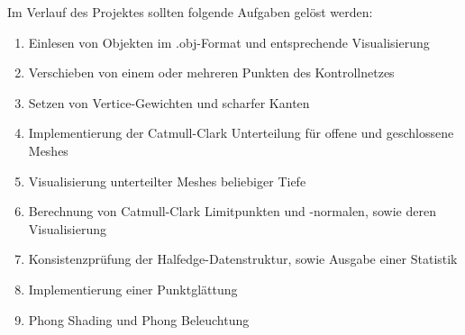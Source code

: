 Im Verlauf des Projektes sollten folgende Aufgaben gelöst werden:
\begin{enumerate}
\item Einlesen von Objekten im .obj-Format und entsprechende Visualisierung
\item Verschieben von einem oder mehreren Punkten des Kontrollnetzes
\item Setzen von Vertice-Gewichten und scharfer Kanten
\item Implementierung der Catmull-Clark Unterteilung für offene und geschlossene Meshes
\item Visualisierung unterteilter Meshes beliebiger Tiefe
\item Berechnung von Catmull-Clark Limitpunkten und -normalen, sowie deren Visualisierung
\item Konsistenzprüfung der Halfedge-Datenstruktur, sowie Ausgabe einer Statistik
\item Implementierung einer Punktglättung
\item Phong Shading und Phong Beleuchtung
\end{enumerate}